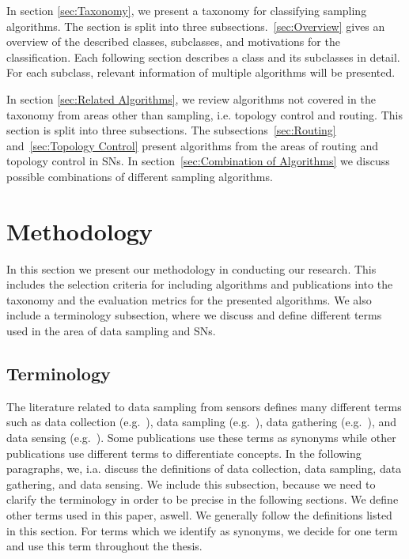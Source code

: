   In section \ref{sec:Taxonomy}, we present a
taxonomy for classifying sampling algorithms. The section is split into three
subsections.~\ref{sec:Overview} gives an overview of the described classes,
subclasses, and motivations for the classification. Each following section
describes a class and its subclasses in detail. For each subclass, relevant
information of multiple algorithms will be presented. 

 In section \ref{sec:Related
Algorithms}, we review algorithms not covered in the taxonomy from areas other
than sampling, i.e. topology control and routing. This section is split into
three subsections. The subsections~\ref{sec:Routing} and~\ref{sec:Topology
Control} present algorithms from the areas of routing and topology control in
\acp{SN}. In section~\ref{sec:Combination of Algorithms} we discuss possible
combinations of different sampling algorithms.

\section{Methodology}
\label{sec:Methodology}

In this section we present our methodology in conducting our research. This
includes the selection criteria for including algorithms and publications into
the taxonomy and the evaluation metrics for the presented algorithms. We also
include a terminology subsection, where we discuss and define different terms
used in the area of data sampling and \acp{SN}.

\subsection{Terminology}
\label{sec:Terminology}

The literature related to data sampling from sensors defines many different
terms such as data collection (e.g.~\cite{laiymani2013adaptive, liu2007energy,
wang2012adaptive}), data sampling (e.g.~\cite{willett2004backcasting,
jain2004adaptive, szczytowski2010asample}), data gathering
(e.g.~\cite{wang2012data, luo2009compressive, zhang2016data}), and data sensing
(e.g.~\cite{padhy2006utility, mahmudimanesh2012balanced, duarte2005joint}).
Some publications use these terms as synonyms while other publications use
different terms to differentiate concepts. In the following paragraphs, we,
i.a. discuss the definitions of data collection, data sampling, data gathering,
and data sensing. We include this subsection, because we need to clarify the
terminology in order to be precise in the following sections. We define other
terms used in this paper, aswell. We generally follow the definitions listed in
this section. For terms which we identify as synonyms, we decide for one term
and use this term throughout the thesis.

